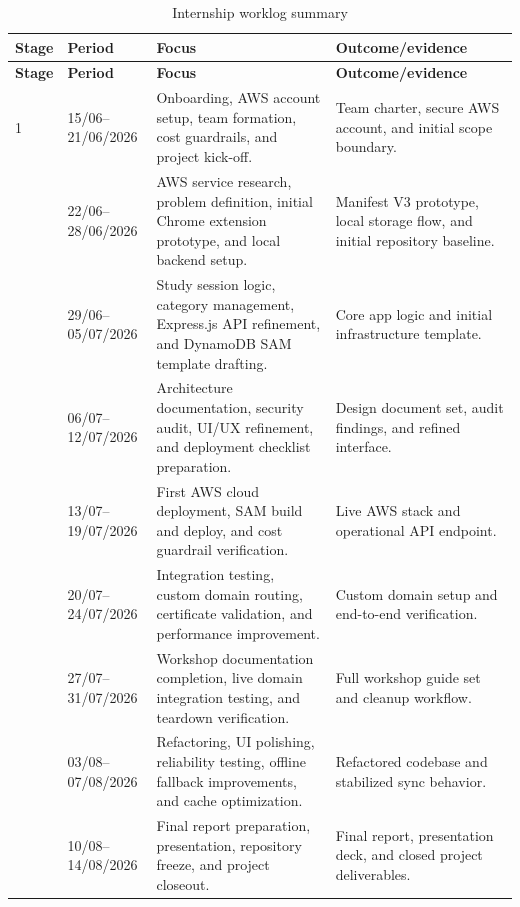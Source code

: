 \begin{longtable}{@{}P{1.5cm}P{2.7cm}P{5.4cm}P{4.6cm}@{}}
  \caption{Internship worklog summary}\\
  \toprule
  \textbf{Stage} & \textbf{Period} & \textbf{Focus} &
  \textbf{Outcome/evidence} \\
  \midrule
  \endfirsthead
  \toprule
  \textbf{Stage} & \textbf{Period} & \textbf{Focus} &
  \textbf{Outcome/evidence} \\
  \midrule
   & 15/06--21/06/2026 & Onboarding, AWS account setup, team formation, cost
    guardrails, and project kick-off. & Team charter, secure AWS account, and
    initial scope boundary. \\
   & 22/06--28/06/2026 & AWS service research, problem definition, initial
    Chrome extension prototype, and local backend setup. & Manifest V3
    prototype, local storage flow, and initial repository baseline. \\
   & 29/06--05/07/2026 & Study session logic, category management, Express.js
    API refinement, and DynamoDB SAM template drafting. & Core app logic and
    initial infrastructure template. \\
   & 06/07--12/07/2026 & Architecture documentation, security audit, UI/UX
    refinement, and deployment checklist preparation. & Design document set,
    audit findings, and refined interface. \\
   & 13/07--19/07/2026 & First AWS cloud deployment, SAM build and deploy,
    and cost guardrail verification. & Live AWS stack and operational API
    endpoint. \\
   & 20/07--24/07/2026 & Integration testing, custom domain routing,
    certificate validation, and performance improvement. & Custom domain setup
    and end-to-end verification. \\
   & 27/07--31/07/2026 & Workshop documentation completion, live domain
    integration testing, and teardown verification. & Full workshop guide set
    and cleanup workflow. \\
   & 03/08--07/08/2026 & Refactoring, UI polishing, reliability testing,
    offline fallback improvements, and cache optimization. & Refactored codebase
    and stabilized sync behavior. \\
   & 10/08--14/08/2026 & Final report preparation, presentation, repository
    freeze, and project closeout. & Final report, presentation deck, and closed
    project deliverables. \\
  \bottomrule
\end{longtable}

